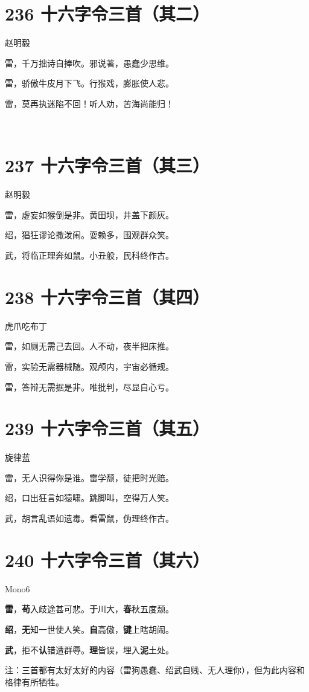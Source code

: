 \documentclass[UTF8,12pt,oneside]{ctexbook}
\def\pau#1{\begin{center} {#1} \end{center}} %
\def\poem#1#2{\section{#1}\pau{#2}} %
\begin{document}
        \poem{236 十六字令三首（其二）}{赵明毅}
        \begin{center}
        雷，千万拙诗自捧吹。邪说著，愚蠢少思维。

        雷，骄傲牛皮月下飞。行猴戏，膨胀使人悲。
        
        雷，莫再执迷陷不回！听人劝，苦海尚能归！

        ~\\
        \end{center}

        \poem{237 十六字令三首（其三）}{赵明毅}
        \begin{center}
        雷，虚妄如猴倒是非。黄田坝，井盖下颜灰。

        绍，猖狂谬论撒泼闹。耍赖多，围观群众笑。

        武，将临正理奔如鼠。小丑般，民科终作古。
        \end{center}

        \newpage

        \poem{238 十六字令三首（其四）}{虎爪吃布丁}
        \begin{center}
        雷，如厕无需己去回。人不动，夜半把床推。

        雷，实验无需器械随。观颅内，宇宙必循规。
        
        雷，答辩无需据是非。唯批判，尽显自心亏。

        \end{center}

        \poem{239 十六字令三首（其五）}{旋律蓝}
        \begin{center}
        雷，无人识得你是谁。雷学颓，徒把时光赔。

        绍，口出狂言如猿啸。跳脚叫，空得万人笑。

        武，胡言乱语如遗毒。看雷鼠，伪理终作古。

        \end{center}

        \poem{240 十六字令三首（其六）}{Mono6}
        \begin{center}
        \textbf{雷}，\textbf{苟}入歧途甚可悲。\textbf{于}川大，\textbf{春}秋五度颓。

        \textbf{绍}，\textbf{无}知一世使人笑。\textbf{自}高傲，\textbf{键}上瞎胡闹。

        \textbf{武}，拒不\textbf{认}错遭群辱。\textbf{理}皆误，埋入\textbf{泥}土处。
        \end{center}

        \kaishu
        注：三首都有太好太好的内容（雷狗愚蠢、绍武自贱、无人理你），但为此内容和格律有所牺牲。
        \songti
\end{document}
